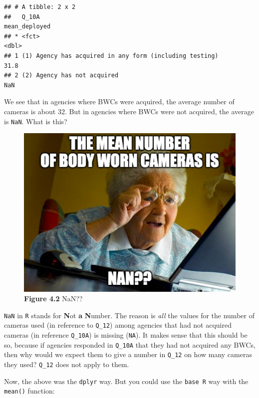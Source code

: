 \documentclass[
]{book}
\newenvironment{Shaded}{\begin{snugshade}}{\end{snugshade}}
\newcommand{\AttributeTok}[1]{\textcolor[rgb]{0.77,0.63,0.00}{#1}}
\newcommand{\ConstantTok}[1]{\textcolor[rgb]{0.00,0.00,0.00}{#1}}
\newcommand{\FunctionTok}[1]{\textcolor[rgb]{0.00,0.00,0.00}{#1}}
\newcommand{\NormalTok}[1]{#1}
\newcommand{\SpecialCharTok}[1]{\textcolor[rgb]{0.00,0.00,0.00}{#1}}
\begin{document}
\begin{verbatim}
## # A tibble: 2 x 2
##   Q_10A                                                   mean_deployed
## * <fct>                                                           <dbl>
## 1 (1) Agency has acquired in any form (including testing)          31.8
## 2 (2) Agency has not acquired                                     NaN
\end{verbatim}

We see that in agencies where BWCs were acquired, the average number of cameras is about 32. But in agencies where BWCs were not acquired, the average is \texttt{NaN}. What is this?

\begin{figure}
\centering
\includegraphics{Images/nan.png}
\caption{\textbf{Figure 4.2} NaN??}
\end{figure}

\texttt{NaN} in \texttt{R} stands for \textbf{N}ot \textbf{a} \textbf{N}umber. The reason is \emph{all} the values for the number of cameras used (in reference to \texttt{Q\_12}) among agencies that had not acquired cameras (in reference \texttt{Q\_10A}) is missing (\texttt{NA}). It makes sense that this should be so, because if agencies responded in \texttt{Q\_10A} that they had not acquired any BWCs, then why would we expect them to give a number in \texttt{Q\_12} on how many cameras they used? \texttt{Q\_12} does not apply to them.

Now, the above was the \texttt{dplyr} way. But you could use the \texttt{base\ R} way with the \texttt{mean()} function:

\begin{Shaded}
\end{Shaded}
\end{document}
